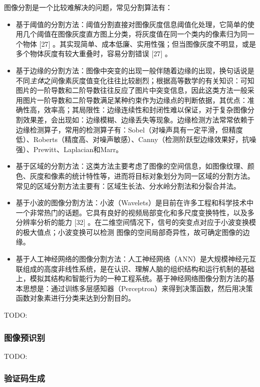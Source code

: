 \documentclass[bachelor,zhspacing]{cqu}  %
\begin{document}
图像分割是一个比较难解决的问题，常见分割算法有：

\begin{itemize}
\item
  基于阈值的分割方法：阈值分割直接对图像灰度信息阈值化处理，它简单的使用几个阈值在图像灰度直方图上分类，将灰度值在同一个类内的像素归为同一个物体
  {[}27{]}
  。其实现简单、成本低廉、实用性强；但当图像灰度不明显，或是多个物体灰度有较大重叠时，容易分割错误
  {[}27{]} 。
\item
  基于边缘的分割方法：图像中突变的出现一般伴随着边缘的出现，换句话说是不同\emph{主体}之间像素灰度值变化往往比较剧烈；根据高等数学的有关知识：可知图片的一阶导数和二阶导数往往反应了图片中突变信息，因此这类方法一般采用图片一阶导数和二阶导数满足某种约束作为边缘点的判断依据，其优点：准确性高，效率高；其局限性：边缘连续性和封闭性难以保证，对于复杂图像分割效果差，会出现如：边缘模糊、边缘丢失等现象。边缘检测方法常常依赖于边缘检测算子，常用的检测算子有：Sobel（对噪声具有一定平滑，但精度低）、Roberts（精度高、对噪声敏感）、Canny（检测阶跃型边缘效果好，抗噪强）、Prewitt、Laplacian和Marr。
\item
  基于区域的分割方法：这类方法主要考虑了图像的空间信息，如图像纹理、颜色、灰度和像素的统计特性等，进而将目标对象划分为同一区域的分割方法。常见的区域分割方法主要有：区域生长法、分水岭分割法和分裂合并法。
\item
  基于小波的图像分割方法：小波（Wavelets）是目前在许多工程和科学技术中一个非常热门的话题。它具有良好的视频局部变化和多尺度变换特性，以及多分辨率分析的能力
  {[}32{]}
  。在二维空间情况下，信号的突变点对应于小波变换模的极大值点；小波变换可以检测
  图像的空间局部奇异性，故可确定图像的边缘。
\item
  基于人工神经网络的图像分割方法：人工神经网络（ANN）是大规模神经元互联组成的高度非线性系统，是在认识、理解人脑的组织结构和运行机制的基础上，模拟其结构和智能行为的一种工程系统。基于神经网络图像分割方法的基本思想是：通过训练多层感知器（Perceptron）来得到决策函数，然后用决策函数对象素进行分类来达到分割目的。
\end{itemize}

TODO:

\subsubsection{图像预识别}\label{ux56feux50cfux9884ux8bc6ux522b}

TODO:

\subsubsection{验证码生成}\label{ux9a8cux8bc1ux7801ux751fux6210}
\end{document}
